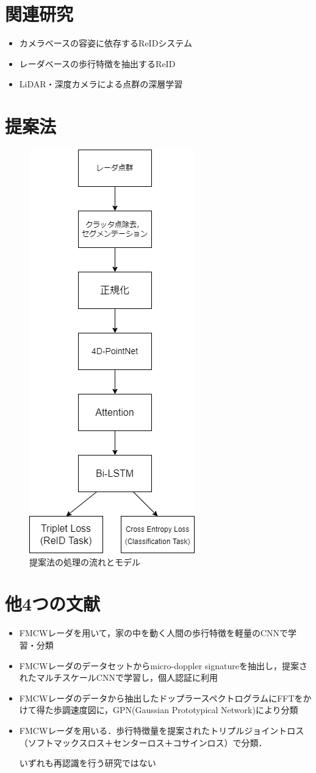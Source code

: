 \documentclass[dvipdfmx]{jsarticle}
\begin{document}
\section{関連研究}
\begin{itemize}
    \item カメラベースの容姿に依存するReIDシステム
    \item レーダベースの歩行特徴を抽出するReID
    \item LiDAR・深度カメラによる点群の深層学習
\end{itemize}
\section{提案法}
\begin{figure}[htbp]
\begin{center}
\includegraphics[width=0.25\linewidth]{./img/ReID_Model.png}
\end{center}
\caption{提案法の処理の流れとモデル}
\end{figure}

\section{他4つの文献}
\begin{itemize}
    \item FMCWレーダを用いて，家の中を動く人間の歩行特徴を軽量のCNNで学習・分類\cite{home}
    \item FMCWレーダのデータセットからmicro-doppler signatureを抽出し，提案されたマルチスケールCNNで学習し，個人認証に利用\cite{multi}
    \item FMCWレーダのデータから抽出したドップラースペクトログラムにFFTをかけて得た歩調速度図に，GPN(Gaussian Prototypical Network)により分類\cite{gpn}
    \item FMCWレーダを用いる．歩行特徴量を提案されたトリプルジョイントロス（ソフトマックスロス＋センターロス＋コサインロス）で分類．\cite{loss}
    
いずれも再認識を行う研究ではない
\end{itemize}
\end{document}
